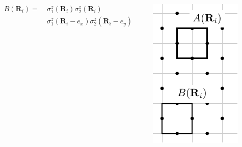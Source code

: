 \documentclass{beamer}
\renewcommand{\(}{\left(}
\renewcommand{\)}{\right)}
\renewcommand{\[}{\left[}
\renewcommand{\]}{\right]}
\begin{document}
\begin{frame}
\begin{columns}
\begin{column}{0.62\textwidth}
\begin{align*}
                    B(\bm R_i) = \ & \sigma^z_{1} (\bm R_i)\sigma^z_{2} (\bm R_i) \\ &\sigma^z_{1} (\bm R_i - e_x)\sigma^z_{2} (\bm R_i - e_y) 
                \end{align*}
        \end{column}
        \begin{column}{0.38\textwidth}
            \centering
            \includegraphics[scale = 1, trim=0 0 0 0, clip]{elementry_loops.pdf}

        \end{column}
    \end{columns}
\end{frame}
\end{document}
